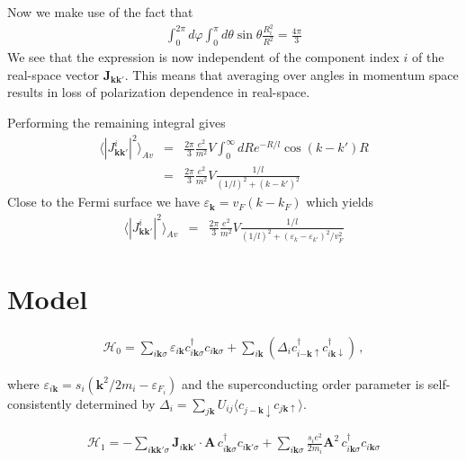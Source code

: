 \documentclass[aps,prb,reprint,noeprint,superscriptaddress]{revtex4-1}
\begin{document}
Now we make use of the fact that
\begin{eqnarray*}
		\int_{0}^{2\pi}d\varphi
		\int_{0}^{\pi}d\theta
		\sin \theta	
		\frac{R_i^2}{R^2}
		= \frac{4\pi}{3}
\end{eqnarray*}
We see that the expression is now independent of the component index $i$ of the
real-space vector $\mathbf{J}_{\mathbf{k}\mathbf{k}'}$. This means that
averaging over angles in momentum space results in loss of polarization
dependence in real-space.

Performing the remaining integral gives 
\begin{eqnarray*}
	\langle 
	\left|J^i_{\mathbf{k}\mathbf{k}'}\right|^2 
	\rangle_{Av}
	&=& 
	\frac{2\pi}{3}\frac{e^2}{m^2} V
		\int_{0}^{\infty}dR
		e^{-R/l} \cos (k-k')R
	\\
	&=& 
	\frac{2\pi}{3}\frac{e^2}{m^2} V
	\frac{1/l}{(1/l)^2+ (k-k')^2}
\end{eqnarray*}
Close to the Fermi surface we have $\varepsilon_\mathbf{k}=v_F(k-k_F)$ which
yields
\begin{eqnarray*}
	\langle 
	\left|J^i_{\mathbf{k}\mathbf{k}'}\right|^2 
	\rangle_{Av}
	&=& 
	\frac{2\pi}{3}\frac{e^2}{m^2} V
	\frac{1/l}{(1/l)^2+ (\varepsilon_k-\varepsilon_{k'})^2/v_F^2}
\end{eqnarray*}

\section{Model}
\begin{eqnarray}
  \mathcal{H}_0 = \sum_{i\mathbf{k}\sigma}  
	\varepsilon_{i\mathbf{k}}c_{i\mathbf{k}\sigma}^\dagger
	c_{i\mathbf{k}\sigma} + \sum_{i\mathbf{k}}^{}
	\left( \Delta_i c_{i\mathbf{-k}\uparrow }^\dagger
	c_{i\mathbf{k}\downarrow }^\dagger  \right) \,,
\end{eqnarray}

where $\varepsilon_{i\mathbf{k}} = s_i \left(\mathbf{k}^2/2m_i -
\varepsilon_{F_i}\right)$ and the superconducting order parameter is self-consistently determined by 
$\Delta_i = \sum_{j\mathbf{k}}^{}U_{ij} \langle c_{j-\mathbf{k}\downarrow
}c_{j\mathbf{k}\uparrow }\rangle$.

\begin{eqnarray*}
	\mathcal{H}_1 = -\sum_{i\mathbf{kk'}\sigma}^{}
	\mathbf{J}_{i\mathbf{kk'}} \cdot \mathbf{A} \,
	c_{i\mathbf{k}\sigma}^\dagger  c_{i\mathbf{k}'\sigma} +
	\sum_{i\mathbf{k}\sigma}^{} \frac{s_i e^2}{2m_i} \mathbf{A}^2 \,
	c_{i\mathbf{k}\sigma}^\dagger c_{i\mathbf{k}\sigma}
\end{eqnarray*}
\end{document}
